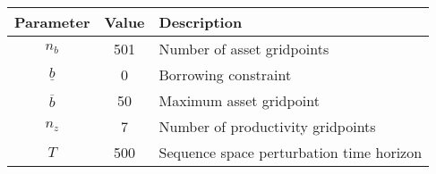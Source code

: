 \begin{tabular}{ccl}
    \toprule
    \textbf{Parameter} & \textbf{Value} & \textbf{Description} \\
    \midrule
    $n_b$ & 501 & Number of asset gridpoints \\
    $\underline{b}$ & 0 & Borrowing constraint \\
    $\overline{b}$ & 50 & Maximum asset gridpoint \\
    $n_z$ & 7 & Number of productivity gridpoints \\
    $T$ & 500 & Sequence space perturbation time horizon \\
    \bottomrule
\end{tabular}